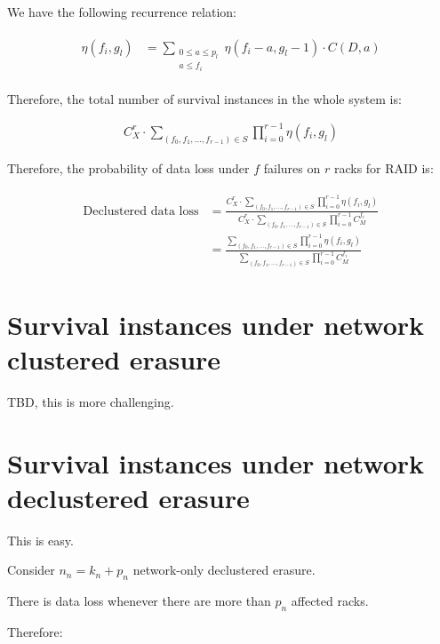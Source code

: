 \documentclass{article}
\begin{document}
We have the following recurrence relation:

\begin{eqnarray}
\begin{aligned}
  \eta(f_i, g_l) &= \sum_{\substack{0 \leq a \leq p_l \\ a\leq f_i}} \eta(f_i-a, g_l-1) \cdot C(D, a)
\end{aligned}
\label{eq:dp:1}
\end{eqnarray}


Therefore, the total number of survival instances in the whole system is:

\begin{eqnarray}
C_{X}^{r} \cdot \sum_{(f_0, f_1, ..., f_{r-1}) \in S} \prod_{i=0}^{r-1} \eta(f_i, g_l)
\label{eq:dp:2}
\end{eqnarray}

Therefore, the probability of data loss under $f$ failures on $r$ racks for RAID is:

\begin{eqnarray}
\begin{aligned}
\text{Declustered data loss} &= \frac{C_{X}^{r} \cdot \sum_{(f_0, f_1, ..., f_{r-1}) \in S} \prod_{i=0}^{r-1} \eta(f_i, g_l)} 
{C_{X}^{r} \cdot \sum_{(f_0, f_1, ..., f_{r-1}) \in S} \prod_{i=0}^{r-1}C_{M}^{f_i}}\\
&= \frac{ \sum_{(f_0, f_1, ..., f_{r-1}) \in S} \prod_{i=0}^{r-1} \eta(f_i, g_l)} 
{\sum_{(f_0, f_1, ..., f_{r-1}) \in S} \prod_{i=0}^{r-1}C_{M}^{f_i}}
\end{aligned}
\label{eq:dp:3}
\end{eqnarray}


\section{Survival instances under network clustered erasure}

TBD, this is more challenging.

\section{Survival instances under network declustered erasure}

This is easy.

Consider $n_n=k_n+p_n$ network-only declustered erasure.

There is data loss whenever there are more than $p_n$ affected racks.

Therefore:
\end{document}
